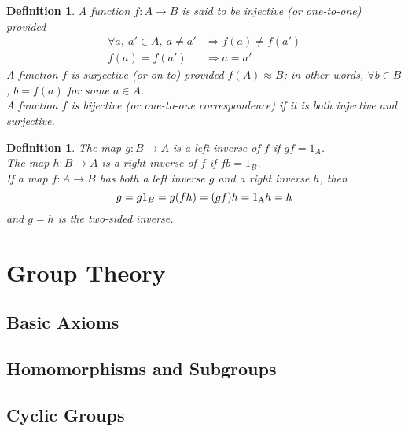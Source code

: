 \documentclass[a4paper,8pt]{article}
\theoremstyle{theorem}
\newtheorem{definition}[theorem]{Definition}
\begin{document}
\begin{definition}
A function $ f: A \rightarrow B$ is said to be \textit{{\color{blue} injective}} (or one-to-one) provided 
\begin{align}
\forall a, \ a' \in A, \ a \neq a' & \Rightarrow f(a) \neq f(a') \nonumber \\
f(a) = f(a') & \Rightarrow a = a' \nonumber
\end{align}
A function $ f $ is \textit{{\color{blue} surjective}} (or on-to) provided $ f(A) \approx B $; in other words, $\forall b \in B $, $ b=f(a) $ for some $ a \in A $.\\
A function $ f $ is \textit{{\color{blue} bijective}} (or one-to-one correspondence) if it is both injective and surjective.\\
\end{definition}


\begin{definition}
The map $ g: B \rightarrow A $ is a \textit{{\color{blue} left inverse}} of $ f $ if $ gf = 1_A $.\\
The map $ h: B \rightarrow A $ is a \textit{{\color{blue} right inverse}} of $ f $ if $ fb = 1_B $.\\
If a map $ f: A \rightarrow B $ has both a left inverse $ g $ and a right inverse $ h $, then
\begin{equation}
g = g1_B = g(fh) = (gf)h = 1 \textsubscript{A} h = h
\nonumber	
\end{equation}
and $ g=h $ is the \textit{{\color{blue} two-sided inverse}}.\\
\end{definition}

\newpage

\section{Group Theory}

\subsection{Basic Axioms}

\subsection{Homomorphisms and Subgroups}

\subsection{Cyclic Groups}
\end{document}
